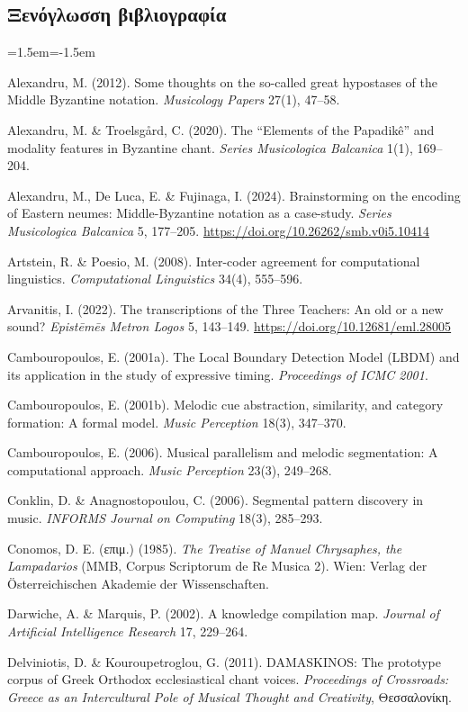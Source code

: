 \documentclass[11pt,a4paper]{article}
\begin{document}
\subsection*{Ξενόγλωσση βιβλιογραφία}
\begin{list}{}{\leftmargin=1.5em\itemindent=-1.5em\itemsep=1pt}
\item Alexandru, M. (2012). Some thoughts on the so-called great hypostases of the Middle Byzantine notation. \emph{Musicology Papers} 27(1), 47--58.
\item Alexandru, M. \& Troelsgård, C. (2020). The “Elements of the Papadikê” and modality features in Byzantine chant. \emph{Series Musicologica Balcanica} 1(1), 169--204.
\item Alexandru, M., De Luca, E. \& Fujinaga, I. (2024). Brainstorming on the encoding of Eastern neumes: Middle-Byzantine notation as a case-study. \emph{Series Musicologica Balcanica} 5, 177--205. \url{https://doi.org/10.26262/smb.v0i5.10414}
\item Artstein, R. \& Poesio, M. (2008). Inter-coder agreement for computational linguistics. \emph{Computational Linguistics} 34(4), 555--596.
\item Arvanitis, I. (2022). The transcriptions of the Three Teachers: An old or a new sound? \emph{Epistēmēs Metron Logos} 5, 143--149. \url{https://doi.org/10.12681/eml.28005}
\item Cambouropoulos, E. (2001a). The Local Boundary Detection Model (LBDM) and its application in the study of expressive timing. \emph{Proceedings of ICMC 2001}.
\item Cambouropoulos, E. (2001b). Melodic cue abstraction, similarity, and category formation: A formal model. \emph{Music Perception} 18(3), 347--370.
\item Cambouropoulos, E. (2006). Musical parallelism and melodic segmentation: A computational approach. \emph{Music Perception} 23(3), 249--268.
\item Conklin, D. \& Anagnostopoulou, C. (2006). Segmental pattern discovery in music. \emph{INFORMS Journal on Computing} 18(3), 285--293.
\item Conomos, D. E. (επιμ.) (1985). \emph{The Treatise of Manuel Chrysaphes, the Lampadarios} (MMB, Corpus Scriptorum de Re Musica 2). Wien: Verlag der Österreichischen Akademie der Wissenschaften.
\item Darwiche, A. \& Marquis, P. (2002). A knowledge compilation map. \emph{Journal of Artificial Intelligence Research} 17, 229--264.
\item Delviniotis, D. \& Kouroupetroglou, G. (2011). DAMASKINOS: The prototype corpus of Greek Orthodox ecclesiastical chant voices. \emph{Proceedings of Crossroads: Greece as an Intercultural Pole of Musical Thought and Creativity}, Θεσσαλονίκη.

\end{list}
\end{document}
